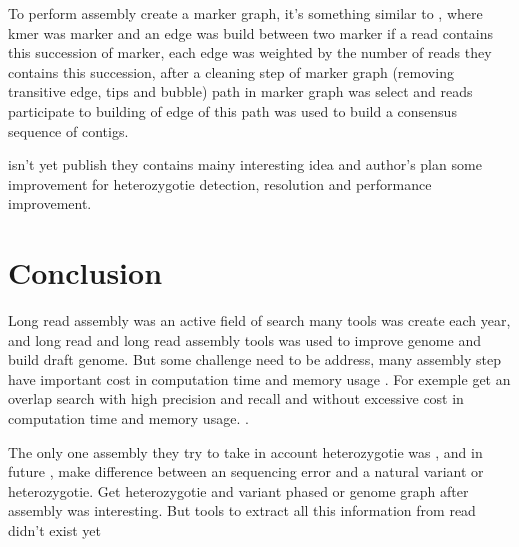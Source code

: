 \documentclass[main]{subfiles}
\begin{document}
To perform assembly \shasta create a marker graph, it's something similar to \DBG, where kmer was marker and an edge was build between two marker if a read contains this succession of marker, each edge was weighted by the number of reads they contains this succession, after a cleaning step of marker graph (removing transitive edge, tips and bubble) path in marker graph was select and reads participate to building of edge of this path was used to build a consensus sequence of contigs.

\shasta isn't yet publish they contains mainy interesting idea and author's plan some improvement for heterozygotie detection, resolution and performance improvement.

\section{Conclusion}


Long read assembly was an active field of search many tools was create each year, and long read and long read assembly tools was used to improve genome and build draft genome.
But some challenge need to be address, many assembly step have important cost in computation time and memory usage . For exemple get an overlap search with high precision and recall and without excessive cost in computation time and memory usage. \cite{bench_ovl}.

The only one assembly they try to take in account heterozygotie was , and in future \shasta, make difference between an sequencing error and a natural variant or heterozygotie. Get heterozygotie and variant phased or genome graph after assembly was interesting. But tools to extract all this information from read didn't exist yet



\end{document}
